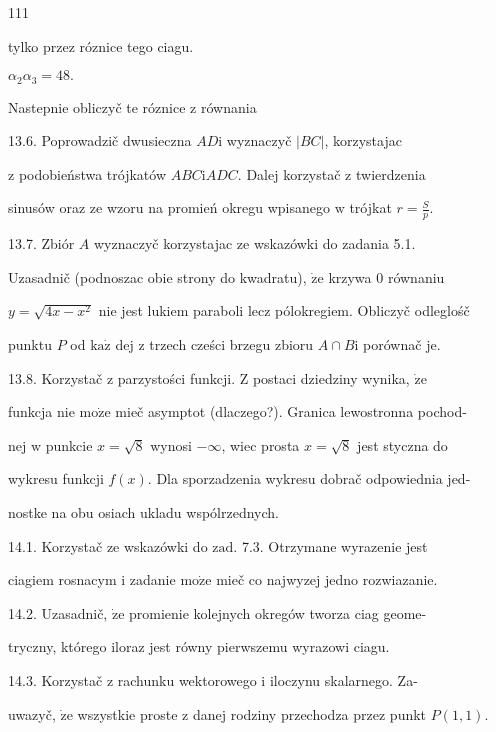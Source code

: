 \documentclass[a4paper,12pt]{article}
\begin{document}
111

tylko przez róznice tego ciagu.

$\alpha_{2}\alpha_{3}=48.$

Nastepnie obliczyč te róznice z równania

13.6. Poprowadzič dwusieczna $AD \mathrm{i}$ wyznaczyč $|BC|$, korzystajac

$\mathrm{z}$ podobieństwa trójkatów $ABC \mathrm{i} ADC$. Dalej korzystač $\mathrm{z}$ twierdzenia

sinusów oraz ze wzoru na promień okregu wpisanego $\mathrm{w}$ trójkat $r=\displaystyle \frac{S}{p}.$

13.7. Zbiór $A$ wyznaczyč korzystajac ze wskazówki do zadania 5.1.

Uzasadnič (podnoszac obie strony do kwadratu), $\dot{\mathrm{z}}\mathrm{e}$ krzywa $0$ równaniu

$y=\sqrt{4x-x^{2}}$ nie jest lukiem paraboli lecz pólokregiem. Obliczyč odleglośč

punktu $P$ od $\mathrm{k}\mathrm{a}\dot{\mathrm{z}}$ dej $\mathrm{z}$ trzech cześci brzegu zbioru $A\cap B\mathrm{i}$ porównač je.

13.8. Korzystač $\mathrm{z}$ parzystości funkcji. $\mathrm{Z}$ postaci dziedziny wynika, $\dot{\mathrm{z}}\mathrm{e}$

funkcja nie $\mathrm{m}\mathrm{o}\dot{\mathrm{z}}\mathrm{e}$ mieč asymptot (dlaczego?). Granica lewostronna pochod-

nej $\mathrm{w}$ punkcie $x = \sqrt{8}$ wynosi $-\infty$, wiec prosta $x = \sqrt{8}$ jest styczna do

wykresu funkcji $f(x)$. Dla sporzadzenia wykresu dobrač odpowiednia jed-

nostke na obu osiach ukladu wspólrzednych.

14.1. Korzystač ze wskazówki do $\mathrm{z}\mathrm{a}\mathrm{d}$. 7.3. Otrzymane wyrazenie jest

ciagiem rosnacym $\mathrm{i}$ zadanie $\mathrm{m}\mathrm{o}\dot{\mathrm{z}}\mathrm{e}$ mieč co najwyzej jedno rozwiazanie.

14.2. Uzasadnič, $\dot{\mathrm{z}}\mathrm{e}$ promienie kolejnych okregów tworza ciag geome-

tryczny, którego iloraz jest równy pierwszemu wyrazowi ciagu.

14.3. Korzystač $\mathrm{z}$ rachunku wektorowego $\mathrm{i}$ iloczynu skalarnego. Za-

uwazyč, $\dot{\mathrm{z}}\mathrm{e}$ wszystkie proste $\mathrm{z}$ danej rodziny przechodza przez punkt $P(1,1).$
\end{document}

